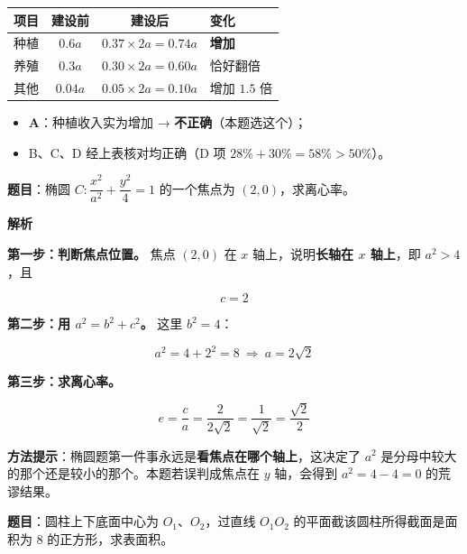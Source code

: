\begin{center}
\begin{tabular}{lccl}
\toprule
项目 & 建设前 & 建设后 & 变化 \\
\midrule
种植 & $0.6a$ & $0.37\times2a=0.74a$ & \textbf{增加} \\
养殖 & $0.3a$ & $0.30\times2a=0.60a$ & 恰好翻倍 \\
其他 & $0.04a$ & $0.05\times2a=0.10a$ & 增加 $1.5$ 倍 \\
\bottomrule
\end{tabular}
\end{center}

\begin{itemize}
\item \textbf{A}：种植收入实为增加 → \textbf{不正确}（本题选这个）；
\item B、C、D 经上表核对均正确（D 项 $28\%+30\%=58\%>50\%$）。
\end{itemize}


\par\medskip


\textbf{题目}：椭圆 $C:\dfrac{x^{2}}{a^{2}}+\dfrac{y^{2}}4=1$ 的一个焦点为 $(2,0)$，求离心率。

\textbf{解析}

\textbf{第一步：判断焦点位置。} 焦点 $(2,0)$ 在 $x$ 轴上，说明\textbf{长轴在 $x$ 轴上}，即 $a^{2}>4$，且

\[c=2\]

\textbf{第二步：用 $a^{2}=b^{2}+c^{2}$。} 这里 $b^{2}=4$：

\[a^{2}=4+2^{2}=8\ \Longrightarrow\ a=2\sqrt2\]

\textbf{第三步：求离心率。}

\[e=\frac ca=\frac2{2\sqrt2}=\frac1{\sqrt2}=\frac{\sqrt2}2\]


\begin{gktip}
\textbf{方法提示}：椭圆题第一件事永远是\textbf{看焦点在哪个轴上}，这决定了 $a^{2}$ 是分母中较大的那个还是较小的那个。本题若误判成焦点在 $y$ 轴，会得到 $a^{2}=4-4=0$ 的荒谬结果。
\end{gktip}

\par\medskip


\textbf{题目}：圆柱上下底面中心为 $O_1$、$O_2$，过直线 $O_1O_2$ 的平面截该圆柱所得截面是面积为 $8$ 的正方形，求表面积。

